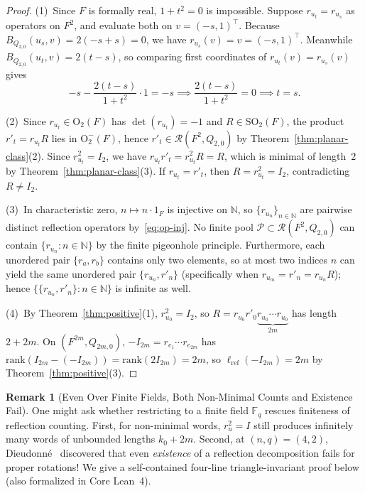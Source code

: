 \documentclass[11pt,a4paper]{article}
\theoremstyle{plain}
\theoremstyle{definition}
\newtheorem{remark}[theorem]{Remark}
\newcommand{\N}{\mathbb{N}}
\newcommand{\F}{\mathbb{F}}
\newcommand{\Orth}{\mathrm{O}}
\newcommand{\SO}{\mathrm{SO}}
\newcommand{\Refl}{\mathcal{R}}
\newcommand{\lref}{\ell_{\mathrm{ref}}}
\newcommand{\rk}{\mathrm{rank}}
\begin{document}
\begin{proof}
(1)~Since $F$ is formally real, $1 + t^2 = 0$ is impossible. Suppose $r_{u_t} = r_{u_s}$ as operators on $F^2$, and evaluate both on $v = (-s, 1)^\top$. Because $B_{Q_{2,0}}(u_s, v) = 2(-s + s) = 0$, we have $r_{u_s}(v) = v = (-s, 1)^\top$. Meanwhile $B_{Q_{2,0}}(u_t, v) = 2(t - s)$, so comparing first coordinates of $r_{u_t}(v) = r_{u_s}(v)$ gives
\[
  -s - \frac{2(t - s)}{1 + t^2} \cdot 1 = -s \implies \frac{2(t - s)}{1 + t^2} = 0 \implies t = s.
\]

(2)~Since $r_{u_t} \in \Orth_2(F)$ has $\det(r_{u_t}) = -1$ and $R \in \SO_2(F)$, the product $r'_t = r_{u_t} R$ lies in $\Orth_2^-(F)$, hence $r'_t \in \Refl(F^2, Q_{2,0})$ by Theorem~\ref{thm:planar-class}(2). Since $r_{u_t}^2 = I_2$, we have $r_{u_t} r'_t = r_{u_t}^2 R = R$, which is minimal of length~$2$ by Theorem~\ref{thm:planar-class}(3). If $r_{u_t} = r'_t$, then $R = r_{u_t}^2 = I_2$, contradicting $R \neq I_2$.

(3)~In characteristic zero, $n \mapsto n \cdot 1_F$ is injective on $\N$, so $\{r_{u_n}\}_{n \in \N}$ are pairwise distinct reflection operators by~\eqref{eq:op-inj}. No finite pool $\mathcal{P} \subset \Refl(F^2, Q_{2,0})$ can contain $\{r_{u_n} : n \in \N\}$ by the finite pigeonhole principle. Furthermore, each unordered pair $\{r_a, r_b\}$ contains only two elements, so at most two indices $n$ can yield the same unordered pair $\{r_{u_n}, r'_n\}$ (specifically when $r_{u_m} = r'_n = r_{u_n} R$); hence $\{\{r_{u_n}, r'_n\} : n \in \N\}$ is infinite as well.

(4)~By Theorem~\ref{thm:positive}(1), $r_{u_0}^2 = I_2$, so $R = r_{u_0} r'_0 \underbrace{r_{u_0} \cdots r_{u_0}}_{2m}$ has length $2 + 2m$. On $(F^{2m}, Q_{2m,0})$, $-I_{2m} = r_{e_1}\cdots r_{e_{2m}}$ has $\rk(I_{2m} - (-I_{2m})) = \rk(2 I_{2m}) = 2m$, so $\lref(-I_{2m}) = 2m$ by Theorem~\ref{thm:positive}(3).
\end{proof}

\begin{remark}[Even Over Finite Fields, Both Non-Minimal Counts and Existence Fail]
One might ask whether restricting to a finite field $\F_q$ rescues finiteness of reflection counting. First, for non-minimal words, $r_u^2 = I$ still produces infinitely many words of unbounded lengths $k_0 + 2m$. Second, at $(n, q) = (4, 2)$, Dieudonn\'e~\cite{Die48} discovered that even \emph{existence} of a reflection decomposition fails for proper rotations! We give a self-contained four-line triangle-invariant proof below (also formalized in Core Lean~4).
\end{remark}
\end{document}
